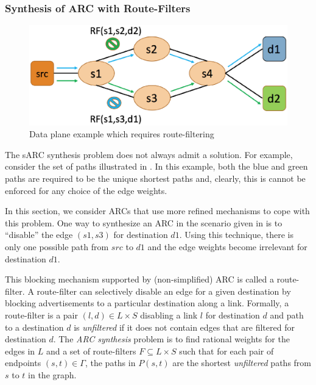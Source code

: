 \subsubsection{Synthesis of ARC with Route-Filters} \label{sec:routefilter}
\begin{figure}[!t] 
	\centering
	\includegraphics[width=0.7\columnwidth]{figures/diamond.eps}
	\caption{Data plane example which requires route-filtering} \label{fig:diamond}
\end{figure}
The sARC synthesis problem does not always admit a solution.
For example, consider the set of paths illustrated in . 
In this example, both the blue and green paths are required to be the unique shortest paths
and, clearly, this is cannot be enforced for any choice of the edge weights.

In this section, we consider ARCs that use more refined mechanisms to
cope with this problem.
One way to synthesize an ARC in the scenario 
given in 
is to ``disable'' the edge
$(s1, s3)$ for destination $d1$.
Using this technique, there is only one possible path from $src$ to $d1$ and the
edge weights become irrelevant for destination $d1$.


This blocking mechanism supported by (non-simplified)
ARC is called a route-filter. 
A route-filter  can selectively disable an
edge for a given destination by  blocking advertisements to a
particular destination along a link. 
Formally, a route-filter is a pair $(l,d)\in L\times S$
disabling a link $l$ for destination $d$
and path to a destination $d$ is \emph{unfiltered} 
if it does not contain edges that are filtered for destination $d$.
The \emph{ARC synthesis} problem
is to find rational weights for the edges in $L$
and a set of route-filters $F\subseteq L\times S$
 such that 
for each pair of endpoints $(s,t) \in \Gamma$, 
the paths in $P(s,t)$ are the shortest \emph{unfiltered} paths from $s$ to $t$ 
in the graph. 

